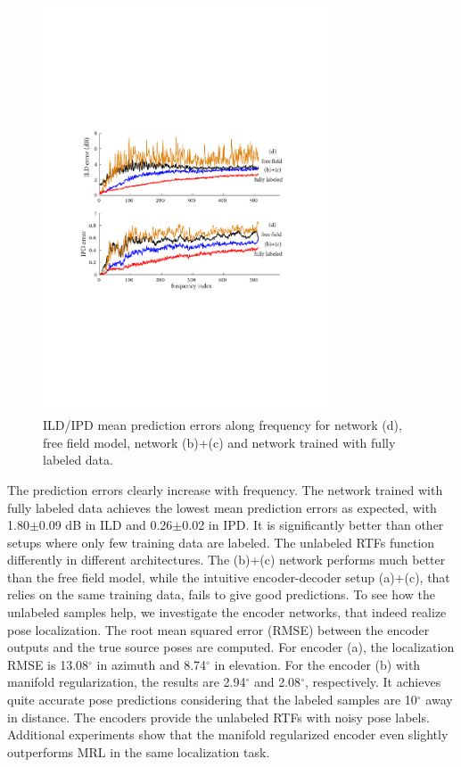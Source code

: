 \documentclass{article}
\begin{document}
\begin{figure}[tb]
    \centering
    \centerline{\includegraphics[width=8.5cm]{fig3_err_freq.pdf}}
    \caption{ILD/IPD mean prediction errors along frequency for network (d), free field model, network (b)+(c) and network trained with fully labeled data.}
    \label{fig3}
\end{figure}

The prediction errors clearly increase with frequency. The network trained with fully labeled data achieves the lowest mean prediction errors as expected, with 1.80$\pm$0.09 dB in ILD and 0.26$\pm$0.02 in IPD. It is significantly better than other setups where only few training data are labeled. The unlabeled RTFs function differently in different architectures. The (b)+(c) network performs much better than the free field model, while the intuitive encoder-decoder setup (a)+(c), that relies on the same training data, fails to give good predictions. To see how the unlabeled samples help, we investigate the encoder networks, that indeed realize pose localization. The root mean squared error (RMSE) between the encoder outputs and the true source poses are computed. For encoder (a), the localization RMSE is 13.08$^{\circ}$ in azimuth and 8.74$^{\circ}$ in elevation. For the encoder (b) with manifold regularization, the results are 2.94$^{\circ}$ and 2.08$^{\circ}$, respectively. It achieves quite accurate pose predictions considering that the labeled samples are 10$^{\circ}$ away in distance. The encoders provide the unlabeled RTFs with noisy pose labels. Additional experiments show that the manifold regularized encoder even slightly outperforms MRL in the same localization task.
\end{document}
